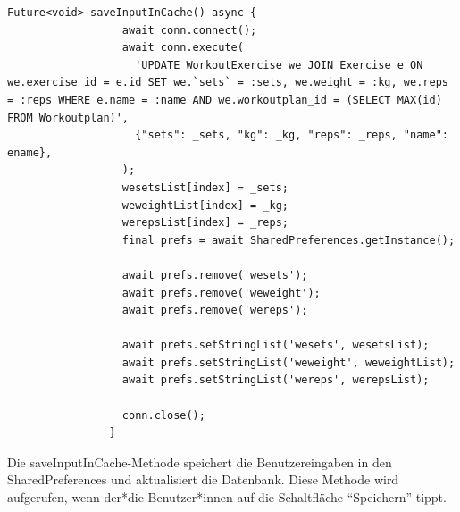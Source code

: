         \begin{lstlisting}[caption=Bearbeiten saveInputInCache,label=lst:impl:frontend:qrcode]
            Future<void> saveInputInCache() async {
                  await conn.connect();
                  await conn.execute(
                    'UPDATE WorkoutExercise we JOIN Exercise e ON we.exercise_id = e.id SET we.`sets` = :sets, we.weight = :kg, we.reps = :reps WHERE e.name = :name AND we.workoutplan_id = (SELECT MAX(id) FROM Workoutplan)',
                    {"sets": _sets, "kg": _kg, "reps": _reps, "name": ename},
                  );
                  wesetsList[index] = _sets;
                  weweightList[index] = _kg;
                  werepsList[index] = _reps;
                  final prefs = await SharedPreferences.getInstance();
            
                  await prefs.remove('wesets');
                  await prefs.remove('weweight');
                  await prefs.remove('wereps');
            
                  await prefs.setStringList('wesets', wesetsList);
                  await prefs.setStringList('weweight', weweightList);
                  await prefs.setStringList('wereps', werepsList);
            
                  conn.close();
                }
        \end{lstlisting}
        
        Die saveInputInCache-Methode speichert die Benutzereingaben in den SharedPreferences und aktualisiert die Datenbank. Diese Methode wird aufgerufen, wenn der*die Benutzer*innen auf die Schaltfläche ``Speichern'' tippt.